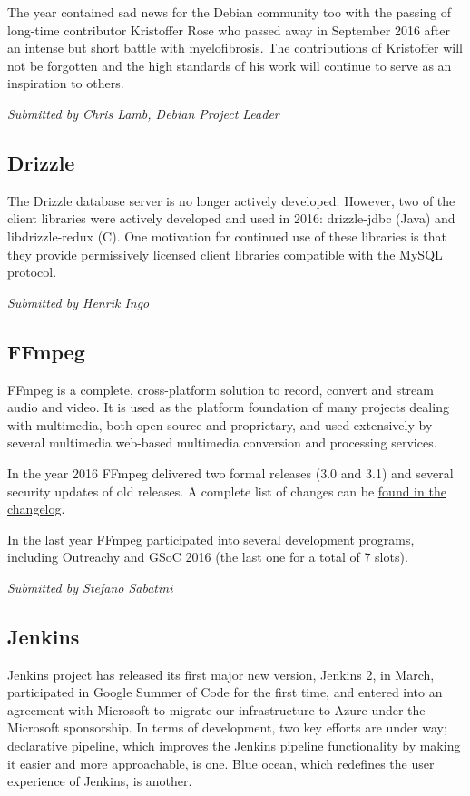 \documentclass[letterpaper]{report}
\begin{document}
The year contained sad news for the Debian community too with the
passing of long-time contributor Kristoffer Rose who passed away in
September 2016 after an intense but short battle with myelofibrosis. The
contributions of Kristoffer will not be forgotten and the high standards
of his work will continue to serve as an inspiration to others.

{\em Submitted by Chris Lamb, Debian Project Leader}

\subsection{Drizzle}

The Drizzle database server is no longer actively developed. However,
two of the client libraries were actively developed and used in 2016:
drizzle-jdbc (Java) and libdrizzle-redux (C). One motivation for
continued use of these libraries is that they provide permissively
licensed client libraries compatible with the MySQL protocol.

{\em Submitted by Henrik Ingo}

\subsection{FFmpeg}

FFmpeg is a complete, cross-platform solution to record, convert and
stream audio and video. It is used as the platform foundation of many
projects dealing with multimedia, both open source and proprietary, and
used extensively by several multimedia web-based multimedia conversion
and processing services.

In the year 2016 FFmpeg delivered two formal releases (3.0 and 3.1) and
several security updates of old releases. A complete list of changes can
be
\href{http://git.videolan.org/?p=ffmpeg.git;a=blob_plain;f=Changelog;hb=HEAD}{found
in the changelog}.

In the last year FFmpeg participated into several development programs,
including Outreachy and GSoC 2016 (the last one for a total of 7 slots).

{\em Submitted by Stefano Sabatini}

\subsection{Jenkins}

Jenkins project has released its first major new version, Jenkins 2, in
March, participated in Google Summer of Code for the first time, and
entered into an agreement with Microsoft to migrate our infrastructure
to Azure under the Microsoft sponsorship. In terms of development, two
key efforts are under way; declarative pipeline, which improves the
Jenkins pipeline functionality by making it easier and more
approachable, is one.  Blue ocean, which redefines the user experience
of Jenkins, is another.
\end{document}
